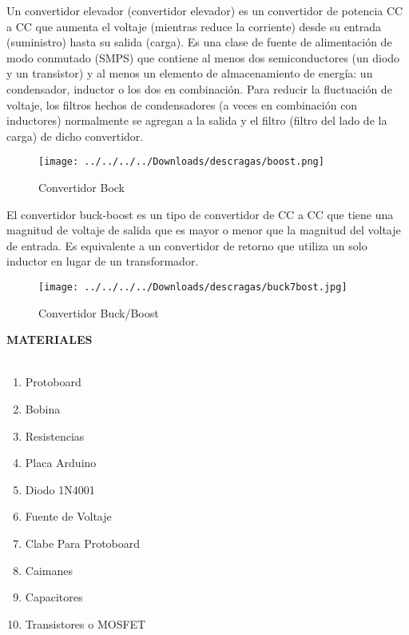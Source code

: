 \documentclass[12pt]{report}
\begin{document}
\newpage
{\large Un convertidor elevador (convertidor elevador) es un convertidor de potencia CC a CC que aumenta el voltaje (mientras reduce la corriente) desde su entrada (suministro) hasta su salida (carga). Es una clase de fuente de alimentación de modo conmutado (SMPS) que contiene al menos dos semiconductores (un diodo y un transistor) y al menos un elemento de almacenamiento de energía: un condensador, inductor o los dos en combinación. Para reducir la fluctuación de voltaje, los filtros hechos de condensadores (a veces en combinación con inductores) normalmente se agregan a la salida y el filtro (filtro del lado de la carga) de dicho convertidor.}
\begin{center}
\begin{figure}[hbtp]
\centering
\texttt{[image: ../../../../Downloads/descragas/boost.png]}
\caption{Convertidor Bock}
\end{figure}

\end{center}
\newpage
{\large El convertidor buck-boost es un tipo de convertidor de CC a CC que tiene una magnitud de voltaje de salida que es mayor o menor que la magnitud del voltaje de entrada. Es equivalente a un convertidor de retorno que utiliza un solo inductor en lugar de un transformador.}
\begin{center}
\begin{figure}[hbtp]
\centering
\texttt{[image: ../../../../Downloads/descragas/buck7bost.jpg]}
\caption{Convertidor Buck/Boost}
\end{figure}

\end{center}
\newpage

{\huge \textbf{MATERIALES}\\}\\


\begin{enumerate}
\item Protoboard
\item Bobina
\item Resistencias
\item Placa Arduino
\item Diodo 1N4001
\item Fuente de Voltaje
\item Clabe Para Protoboard
\item Caimanes
\item Capacitores
\item Transistores o MOSFET 
\end{enumerate}
\end{document}
